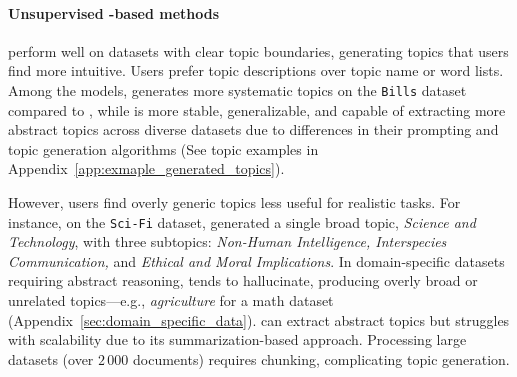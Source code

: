 \paragraph{Unsupervised \mm{}-based methods}
perform well on datasets with clear topic boundaries, generating topics that users find more intuitive.
%
Users prefer topic descriptions over topic name or word lists.
%
Among the models, \topicgpt{} generates more systematic topics on the
\texttt{Bills} dataset compared to \lloom{}, while \lloom{} is more stable, generalizable, and capable of extracting more abstract topics across diverse datasets due to differences in their prompting and topic generation algorithms (See topic examples in Appendix~\ref{app:exmaple_generated_topics}).
%


However, users find overly generic topics less useful for realistic tasks.
%
For instance, on the \texttt{Sci-Fi} dataset, \topicgpt{} generated a single
broad topic, \textit{Science and Technology}, with three
subtopics: \textit{Non-Human Intelligence, Interspecies
Communication,} and \textit{Ethical and Moral Implications}.
%
In domain-specific datasets requiring abstract reasoning, \topicgpt{} tends to hallucinate,
producing overly broad or unrelated topics---e.g., {\it agriculture} for a math dataset (Appendix~\ref{sec:domain_specific_data}).
%
\lloom{} can extract abstract topics but struggles with scalability due to its summarization-based approach. 
%
Processing large datasets (over \(2\,000\) documents) requires chunking,
complicating topic generation. %
%


